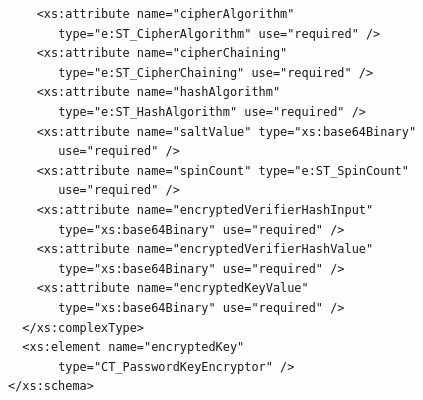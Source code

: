 \documentclass[11pt,oneside]{fithesis2}
\begin{document}
\begin{appendix}
\begin{lstlisting}
    <xs:attribute name="cipherAlgorithm" 
       type="e:ST_CipherAlgorithm" use="required" /> 
    <xs:attribute name="cipherChaining"
       type="e:ST_CipherChaining" use="required" /> 
    <xs:attribute name="hashAlgorithm" 
       type="e:ST_HashAlgorithm" use="required" /> 
    <xs:attribute name="saltValue" type="xs:base64Binary" 
       use="required" /> 
    <xs:attribute name="spinCount" type="e:ST_SpinCount"
       use="required" />
    <xs:attribute name="encryptedVerifierHashInput"
       type="xs:base64Binary" use="required" /> 
    <xs:attribute name="encryptedVerifierHashValue"
       type="xs:base64Binary" use="required" />
    <xs:attribute name="encryptedKeyValue"
       type="xs:base64Binary" use="required" />
  </xs:complexType> 
  <xs:element name="encryptedKey" 
       type="CT_PasswordKeyEncryptor" />
</xs:schema>
	\end{lstlisting}
\end{appendix}
\end{document}
